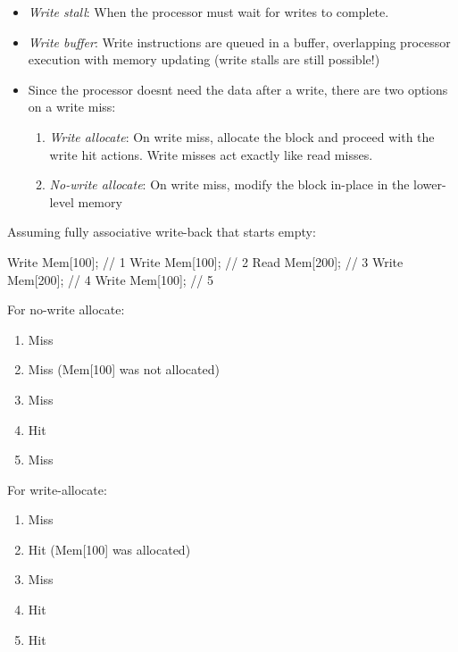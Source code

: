 \documentclass[11pt, a4paper]{article}
\theoremstyle{definition}
\theoremstyle{remark}
\begin{document}
\begin{itemize}
  \item \textit{Write stall}: When the processor must wait for writes to complete.
  \item \textit{Write buffer}: Write instructions are queued in a buffer, overlapping processor execution with memory updating (write stalls are still possible!)
  \item Since the processor doesnt need the data after a write, there are two options on a write miss:
  \begin{enumerate}
    \item \textit{Write allocate}: On write miss, allocate the block and proceed with the write hit actions. Write misses act exactly like read misses.
    \item \textit{No-write allocate}: On write miss, modify the block in-place in the lower-level memory
  \end{enumerate}
\end{itemize}
Assuming fully associative write-back that starts empty:
\begin{bashcode}
Write Mem[100]; // 1
Write Mem[100]; // 2
Read  Mem[200]; // 3
Write Mem[200]; // 4
Write Mem[100]; // 5
\end{bashcode}
For no-write allocate:
\begin{enumerate}
  \item Miss
  \item Miss (Mem[100] was not allocated)
  \item Miss 
  \item Hit 
  \item Miss
\end{enumerate}
For write-allocate:
\begin{enumerate}
  \item Miss 
  \item Hit (Mem[100] was allocated) 
  \item Miss 
  \item Hit 
  \item Hit
\end{enumerate}
\end{document}
